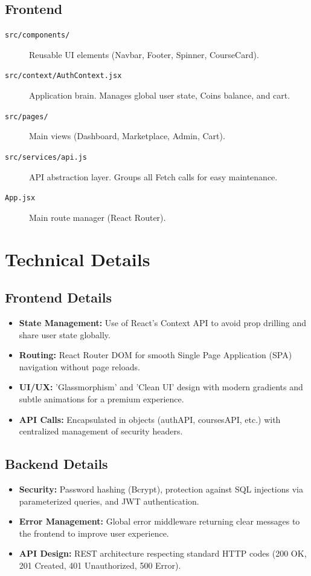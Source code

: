 \documentclass[12pt,a4paper]{article}
\begin{document}
\subsection{Frontend}
\begin{description}
    \item[\texttt{src/components/}] Reusable UI elements (Navbar, Footer, Spinner, CourseCard).
    \item[\texttt{src/context/AuthContext.jsx}] Application brain. Manages global user state, Coins balance, and cart.
    \item[\texttt{src/pages/}] Main views (Dashboard, Marketplace, Admin, Cart).
    \item[\texttt{src/services/api.js}] API abstraction layer. Groups all Fetch calls for easy maintenance.
    \item[\texttt{App.jsx}] Main route manager (React Router).
\end{description}

\section{Technical Details}
\subsection{Frontend Details}
\begin{itemize}[noitemsep]
    \item \textbf{State Management:} Use of React's Context API to avoid prop drilling and share user state globally.
    \item \textbf{Routing:} React Router DOM for smooth Single Page Application (SPA) navigation without page reloads.
    \item \textbf{UI/UX:} 'Glassmorphism' and 'Clean UI' design with modern gradients and subtle animations for a premium experience.
    \item \textbf{API Calls:} Encapsulated in objects (authAPI, coursesAPI, etc.) with centralized management of security headers.
\end{itemize}

\subsection{Backend Details}
\begin{itemize}[noitemsep]
    \item \textbf{Security:} Password hashing (Bcrypt), protection against SQL injections via parameterized queries, and JWT authentication.
    \item \textbf{Error Management:} Global error middleware returning clear messages to the frontend to improve user experience.
    \item \textbf{API Design:} REST architecture respecting standard HTTP codes (200 OK, 201 Created, 401 Unauthorized, 500 Error).
\end{itemize}
\end{document}
